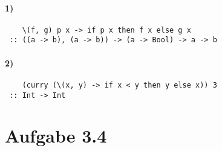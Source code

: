 \documentclass[a4paper]{scrartcl}
\begin{document}
\paragraph{1)}
\begin{verbatim}
    \(f, g) p x -> if p x then f x else g x
 :: ((a -> b), (a -> b)) -> (a -> Bool) -> a -> b
\end{verbatim}

\paragraph{2)}
\begin{verbatim}
    (curry (\(x, y) -> if x < y then y else x)) 3
 :: Int -> Int
\end{verbatim}


\section*{Aufgabe 3.4}
\inputminted{haskell}{update.hs}
\end{document}
